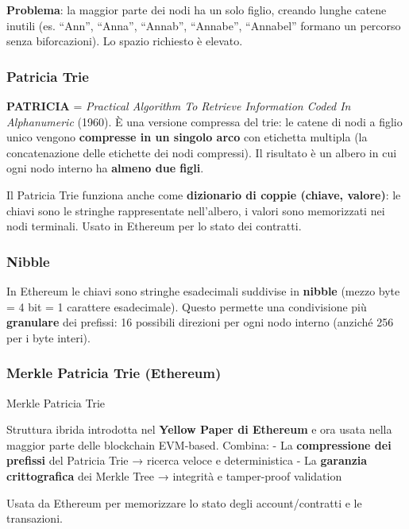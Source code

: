 \documentclass[
  italian,
  openany]{book}
\begin{document}
\textbf{Problema}: la maggior parte dei nodi ha un solo figlio, creando
lunghe catene inutili (es. ``Ann'', ``Anna'', ``Annab'', ``Annabe'',
``Annabel'' formano un percorso senza biforcazioni). Lo spazio richiesto
è elevato.

\subsubsection{Patricia Trie}\label{patricia-trie}

\textbf{PATRICIA} = \emph{Practical Algorithm To Retrieve Information
Coded In Alphanumeric} (1960). È una versione compressa del trie: le
catene di nodi a figlio unico vengono \textbf{compresse in un singolo
arco} con etichetta multipla (la concatenazione delle etichette dei nodi
compressi). Il risultato è un albero in cui ogni nodo interno ha
\textbf{almeno due figli}.

Il Patricia Trie funziona anche come \textbf{dizionario di coppie
(chiave, valore)}: le chiavi sono le stringhe rappresentate nell'albero,
i valori sono memorizzati nei nodi terminali. Usato in Ethereum per lo
stato dei contratti.

\subsubsection{Nibble}\label{nibble}

In Ethereum le chiavi sono stringhe esadecimali suddivise in
\textbf{nibble} (mezzo byte = 4 bit = 1 carattere esadecimale). Questo
permette una condivisione più \textbf{granulare} dei prefissi: 16
possibili direzioni per ogni nodo interno (anziché 256 per i byte
interi).

\subsubsection{Merkle Patricia Trie
(Ethereum)}\label{merkle-patricia-trie-ethereum}

\begin{calloutdefinition}{Merkle Patricia Trie}

Struttura ibrida introdotta nel \textbf{Yellow Paper di Ethereum} e ora
usata nella maggior parte delle blockchain EVM-based. Combina: - La
\textbf{compressione dei prefissi} del Patricia Trie → ricerca veloce e
deterministica - La \textbf{garanzia crittografica} dei Merkle Tree →
integrità e tamper-proof validation

Usata da Ethereum per memorizzare lo stato degli account/contratti e le
transazioni.

\end{calloutdefinition}
\end{document}
